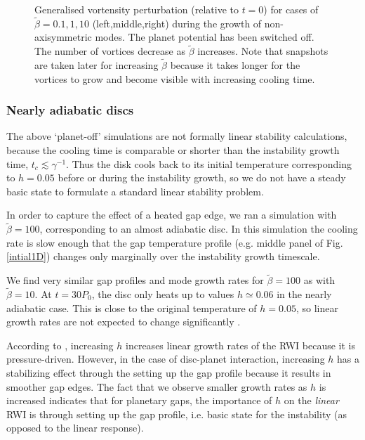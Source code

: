 \begin{figure}
{  }  
  \caption{Generalised vortensity perturbation (relative to $t=0$) for
    cases of $\tilde{\beta}=0.1,1,10$ (left,middle,right) during
    the growth of non-axisymmetric modes. The planet potential has
    been switched off.  The number of vortices
    decrease as $\tilde{\beta}$ increases. Note that snapshots are
    taken later for increasing $\tilde{\beta}$ because it takes longer
    for the vortices to grow and become visible with increasing cooling time. 
    \label{2Dlinear} 
  } 
\end{figure}

\subsubsection{Nearly adiabatic discs}
\label{adiabatic_section}

The above `planet-off' simulations are not formally linear
stability calculations, because the cooling time is comparable or shorter
than the instability growth time, $t_c\lesssim\gamma^{-1}$.  
Thus the disk cools back to its initial temperature corresponding to
$h=0.05$ before or during the instability growth, so we do not 
have a steady basic state to formulate a standard linear stability 
problem. 

In order to capture the effect of a heated gap edge, we ran a simulation with 
$\tilde{\beta}=100$, corresponding to an almost adiabatic disc.  
In this simulation the cooling rate is slow enough that the gap 
temperature profile (e.g. middle panel of Fig. \ref{intial1D}) changes
only marginally over the instability growth timescale. 

We find very similar gap profiles and mode growth rates for
$\tilde{\beta}=100$ as with $\tilde{\beta}=10$. At $t=30P_0$, the disc only heats up to
values $h\simeq0.06$ in the nearly adiabatic case. This is close to
the original temperature of $h=0.05$, so linear growth rates are not expected
to change significantly \citep{li00}. 

According to \cite{li00}, increasing $h$ increases linear growth rates
of the RWI because it is pressure-driven. However, in the case 
of disc-planet interaction, increasing $h$ has a stabilizing effect
through the setting up the gap profile because it results in smoother gap
edges. The fact that we observe smaller growth rates as $h$ is
increased indicates that for planetary gaps, the importance of $h$ on
the \emph{linear} RWI is through setting up the gap profile, i.e. basic
state for the instability (as opposed to the linear response). 

